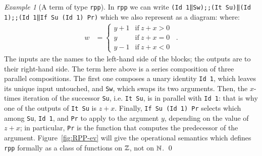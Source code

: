 \documentclass[preprint]{elsarticle}
\theoremstyle{remark}
\newtheorem{example}{Example}
\begin{document}
\begin{example}[A term of type \texttt{rpp}]
\label{example:A first legal term of type RPP}
In \lstinline|rpp| we can write \lstinline|(Id 1‖Sw);;(It Su)‖(Id 1);;(Id 1‖If Su (Id 1) Pr)| which we also represent as a diagram:
where:
$$ \begin{aligned}
    w & = \begin{cases}
        y+1 & \textrm{if}\ z+x>0 \\
        y & \textrm{if}\ z+x=0 \\
        y-1 & \textrm{if}\ z+x<0
    \end{cases}
\enspace .
\end{aligned} $$
The inputs are the names to the left-hand side of the blocks; the outputs are to their right-hand side.
The term here above is a series composition of three parallel compositions.
The first one composes a unary identity \lstinline|Id 1|, which leaves its unique input untouched, and \lstinline|Sw|, which swaps its two arguments. Then, the $ x $-times iteration of the successor \lstinline|Su|, i.e. \lstinline|It Su|, is in parallel with \lstinline|Id 1|: that is why one of the outputs of \lstinline|It Su| is $ z + x $. Finally, \lstinline|If Su (Id 1) Pr| selects which among \lstinline|Su|, \lstinline|Id 1|, and \lstinline|Pr| to apply to the argument $ y $, depending on the value of $ z+x $; in particular, \lstinline|Pr| is the function that computes the predecessor of the argument. Figure~\ref{fig:RPP-ev} will give the operational semantics which defines \lstinline|rpp| formally as a class of functions on $ \mathbb{Z}$, not on $ \mathbb{N} $.
\qed
\end{example}
\end{document}
